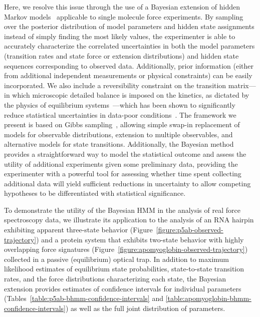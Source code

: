 \documentclass[aps,pre,twocolumn,superscriptaddress,nofootinbib,longbibliography]{revtex4-1}
\begin{document}
{Here, we resolve this issue through the use of a Bayesian extension of hidden Markov models~\cite{robert:stat-prob-lett:1993:bayesian-hmm,chib:j-econometrics:1996:bayesian-hmm,scott:j-am-stat-assoc:2002:bayesian-hmm,ryden:bayesian-analysis:2008:bayesian-hmm} applicable to single molecule force experiments.
By sampling over the posterior distribution of model parameters and hidden state assignments instead of simply finding the most likely values, the experimenter is able to accurately characterize the correlated uncertainties in both the model parameters (transition rates and state force or extension distributions) and hidden state sequences corresponding to observed data.
Additionally, prior information (either from additional independent measurements or physical constraints) can be easily incorporated.
We also include a reversibility constraint on the transition matrix---in which microscopic detailed balance is imposed on the kinetics, as dictated by the physics of equilibrium systems~\cite{van-kampen}---which has been shown to significantly reduce statistical uncertainties in data-poor conditions~\cite{noe:jcp:2008:transition-matrix-sampling,metzner-noe-schuette:pre:2009:transition-matrix-sampling}.
The framework we present is based on Gibbs sampling~\cite{geman-geman:ieee-trans-pattern-analysis:1984:gibbs-sampling,jun-s-liu:mcmc}, allowing simple swap-in replacement of models for observable distributions, extension to multiple observables, and alternative models for state transitions.
Additionally, the Bayesian method provides a straightforward way to model the statistical outcome and assess the utility of additional experiments given some preliminary data, providing the experimenter with a powerful tool for assessing whether time spent collecting additional data will yield sufficient reductions in uncertainty to allow competing hypotheses to be differentiated with statistical significance.

{\color{red}To demonstrate the utility of the Bayesian HMM in the analysis of real force spectroscopy data, we illustrate its application to the analysis of an RNA hairpin exhibiting apparent three-state behavior (Figure~\ref{figure:p5ab-observed-trajectory}) and a protein system that exhibits two-state behavior with highly overlapping force signatures (Figure~\ref{figure:apomyoglobin-observed-trajectory}) collected in a passive (equilibrium) optical trap.
In addition to maximum likelihood estimates of equilibrium state probabilities, state-to-state transition rates, and the force distributions characterizing each state, the Bayesian extension provides estimates of confidence intervals for individual parameters (Tables~\ref{table:p5ab-bhmm-confidence-intervals} and \ref{table:apomyoglobin-bhmm-confidence-intervals}) as well as the full joint distribution of parameters.

}}
\end{document}
